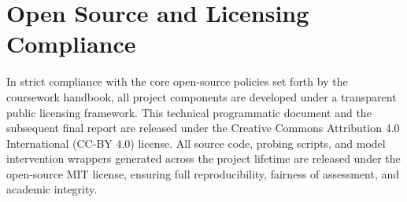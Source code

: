 \documentclass[11pt,a4paper]{article}
\begin{document}
\section{Open Source and Licensing Compliance}
In strict compliance with the core open-source policies set forth by the coursework handbook, all project components are developed under a transparent public licensing framework. This technical programmatic document and the subsequent final report are released under the Creative Commons Attribution 4.0 International (CC-BY 4.0) license. All source code, probing scripts, and model intervention wrappers generated across the project lifetime are released under the open-source MIT license, ensuring full reproducibility, fairness of assessment, and academic integrity.
\end{document}
